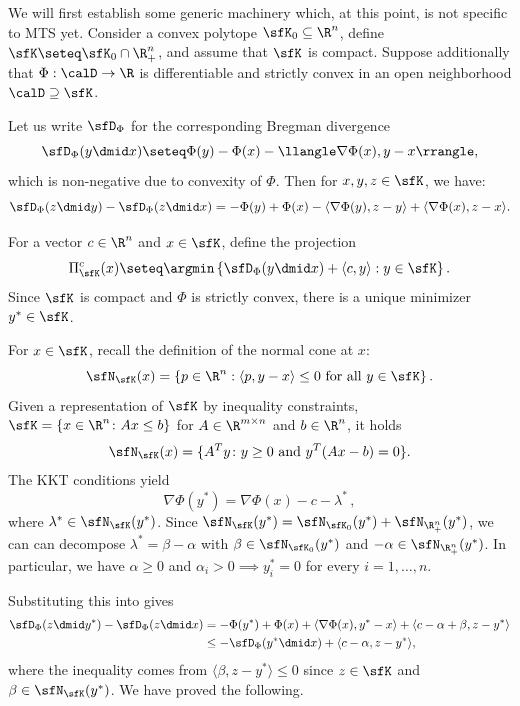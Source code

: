 We will first establish some generic machinery which, at this point, is not specific to MTS yet. Consider a convex polytope 
$\sfK_0\subseteq \R^n$, define $\sfK \seteq \sfK_0 \cap \R_+^n$, and assume that $\sfK$ is compact.
Suppose additionally that $\Phi : \calD \to \R$
is differentiable and strictly convex in an open neighborhood $\calD\supseteq \sfK$.

Let us write $\sfD_{\Phi}$ for the corresponding Bregman divergence
\[
\sfD_{\Phi}(y \dmid x) \seteq \Phi(y) - \Phi(x) - \llangle \nabla \Phi(x), y-x\rrangle,
\]
which is non-negative due to convexity of $\Phi$.
Then for $x,y,z \in \sfK$, we have:
\begin{equation}\label{eq:s1}
\sfD_{\Phi}(z \dmid y) - \sfD_{\Phi}(z \dmid x) = -\Phi(y)+\Phi(x)-\langle \nabla \Phi(y), z-y\rangle+\langle \nabla \Phi(x),z-x\rangle.
\end{equation}

For a vector $c \in \R^n$ and $x \in \sfK$, define the projection
\[
\Pi_{\sfK}^c (x) \seteq \argmin \left\{ \sfD_{\Phi}(y \dmid x) + \langle c,y\rangle : y \in \sfK \right\}.
\]
Since $\sfK$ is compact and $\Phi$ is strictly convex, there is a unique minimizer $y^* \in \sfK$.

For $x \in \sfK$, recall the definition of the normal cone at $x$:
\[\sfN_{\sfK}(x) = \left\{ p \in \R^n : \langle p, y-x\rangle \leq 0 \textrm{ for all } y \in \sfK \right\}.\]
Given a representation of $\sfK$ by inequality constraints, $\sfK=\{x\in\R^n\colon Ax\le b\}$ for $A\in\R^{m\times n}$ and $b\in\R^n$, it holds
\begin{align*}
\sfN_{\sfK}(x) = \{A^Ty\colon y\ge0\text{ and }y^T(Ax-b)=0\}.
\end{align*}
The KKT conditions yield
\begin{equation}\label{eq:KKT}
\nabla \Phi(y^*) = \nabla \Phi(x) - c - \lambda^*\,,
\end{equation}
where $\lambda^* \in \sfN_{\sfK}(y^*)$.
Since $\sfN_{\sfK}(y^*) = \sfN_{\sfK_0}(y^*) + \sfN_{\R_+^n}(y^*)$, we can
can decompose $\lambda^* = \beta - \alpha$ 
with $\beta \in \sfN_{\sfK_0}(y^*)$ and $- \alpha \in \sfN_{\R_+^n}(y^*)$.
In particular, we have $\alpha \geq 0$ and
$\alpha_i > 0 \implies y^*_i = 0$ for every $i=1,\ldots,n$.

Substituting this into  gives
\begin{align*}
\sfD_{\Phi}(z \dmid y^*) - \sfD_{\Phi}(z \dmid x) &= -\Phi(y^*)+\Phi(x)+\langle \nabla \Phi(x),y^*-x\rangle +
\langle c-\alpha + \beta, z-y^* \rangle \\
&\leq -\sfD_{\Phi}(y^* \dmid x) + \langle c-\alpha, z-y^*\rangle,
\end{align*}
where the inequality comes from $\langle \beta, z-y^*\rangle \leq 0$ since $z \in \sfK$ and $\beta \in \sfN_{\sfK}(y^*)$.
We have proved the following.

